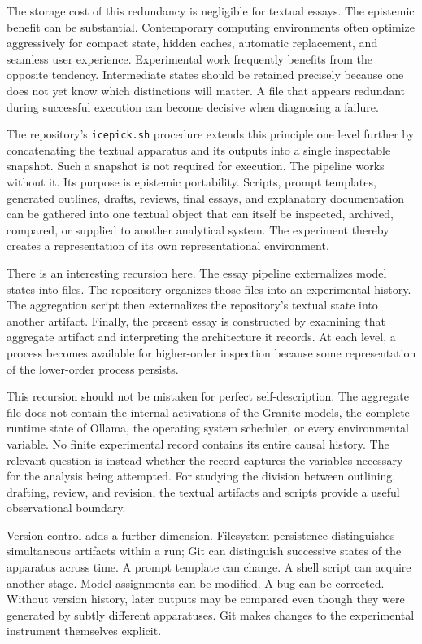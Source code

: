 \documentclass[11pt]{article}
\begin{document}
The storage cost of this redundancy is negligible for textual essays. The epistemic benefit can be substantial. Contemporary computing environments often optimize aggressively for compact state, hidden caches, automatic replacement, and seamless user experience. Experimental work frequently benefits from the opposite tendency. Intermediate states should be retained precisely because one does not yet know which distinctions will matter. A file that appears redundant during successful execution can become decisive when diagnosing a failure.

The repository's \texttt{icepick.sh} procedure extends this principle one level further by concatenating the textual apparatus and its outputs into a single inspectable snapshot. Such a snapshot is not required for execution. The pipeline works without it. Its purpose is epistemic portability. Scripts, prompt templates, generated outlines, drafts, reviews, final essays, and explanatory documentation can be gathered into one textual object that can itself be inspected, archived, compared, or supplied to another analytical system. The experiment thereby creates a representation of its own representational environment.

There is an interesting recursion here. The essay pipeline externalizes model states into files. The repository organizes those files into an experimental history. The aggregation script then externalizes the repository's textual state into another artifact. Finally, the present essay is constructed by examining that aggregate artifact and interpreting the architecture it records. At each level, a process becomes available for higher-order inspection because some representation of the lower-order process persists.

This recursion should not be mistaken for perfect self-description. The aggregate file does not contain the internal activations of the Granite models, the complete runtime state of Ollama, the operating system scheduler, or every environmental variable. No finite experimental record contains its entire causal history. The relevant question is instead whether the record captures the variables necessary for the analysis being attempted. For studying the division between outlining, drafting, review, and revision, the textual artifacts and scripts provide a useful observational boundary.

Version control adds a further dimension. Filesystem persistence distinguishes simultaneous artifacts within a run; Git can distinguish successive states of the apparatus across time. A prompt template can change. A shell script can acquire another stage. Model assignments can be modified. A bug can be corrected. Without version history, later outputs may be compared even though they were generated by subtly different apparatuses. Git makes changes to the experimental instrument themselves explicit.
\end{document}

